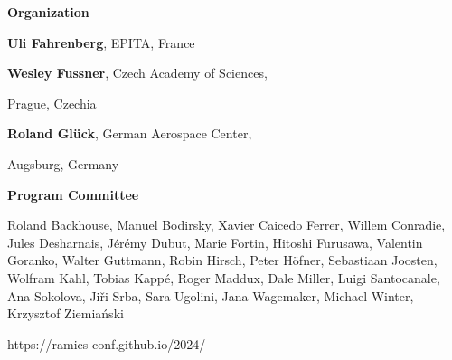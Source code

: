 \documentclass[a3paper, 12pt]{article}
\begin{document}
\begin{minipage}[t]{.43\linewidth}
  \medskip
  

  \vspace*{7ex}
  
  \hfill {\Large \bf Organization}

  \smallskip

  \hfill \textbf{Uli Fahrenberg}, EPITA, France

  \hfill \textbf{Wesley Fussner}, Czech Academy of Sciences,

  \hfill Prague, Czechia

  \hfill \textbf{Roland Glück}, German Aerospace Center,

  \hfill Augsburg, Germany

  \bigskip

  \hfill {\Large \bf Program Committee}

  \smallskip

  Roland Backhouse,
  Manuel Bodirsky,
  Xavier Caicedo Ferrer,
  Willem Conradie,
  Jules Desharnais,
  Jérémy Dubut,
  Marie Fortin,
  Hitoshi Furusawa,
  Valentin Goranko,
  Walter Guttmann,
  Robin Hirsch,
  Peter Höfner,
  Sebastiaan Joosten,
  Wolfram Kahl,
  Tobias Kappé,
  Roger Maddux,
  Dale Miller,
  Luigi Santocanale,
  Ana Sokolova,
  Jiři Srba,
  Sara Ugolini,
  Jana Wagemaker,
  Michael Winter,
  Krzysztof Ziemiański

  \vspace{8ex}

  \hspace*{-15ex} {\fontsize{30}{40}\selectfont https://ramics-conf.github.io/2024/}

  \vspace*{-2ex}

\end{minipage}
\end{document}
